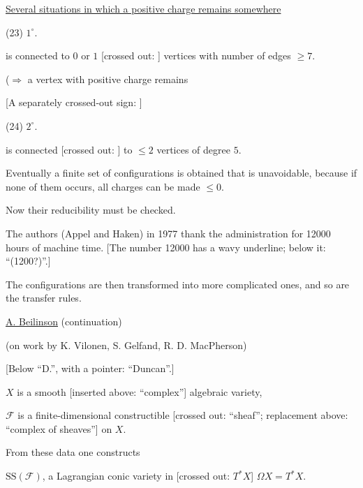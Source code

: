 \underline{Several situations in which a positive charge remains somewhere}

(23) $1^{\circ}$.
is connected to $0$ or $1$ [crossed out: ] vertices with number of edges $\geq7$.

($\Rightarrow$ a vertex with positive charge remains

[A separately crossed-out sign: ]

(24) $2^{\circ}$.
is connected [crossed out: ] to $\leq2$ vertices of degree $5$.

Eventually a finite set of configurations is obtained that is unavoidable,
because if none of them occurs, all
charges can be made $\leq0$.



Now their reducibility must be checked.

The authors (Appel and Haken) in 1977 thank the administration
for 12000 hours of machine time.
[The number 12000 has a wavy underline; below it: “(1200?)”.]

The configurations are then transformed into more complicated ones,
and so are the transfer rules.

\underline{\underline{A. Beilinson}} (continuation)

(on work by K. Vilonen, S. Gelfand, R. D. MacPherson)

[Below “D.”, with a pointer: “Duncan”.]

$X$ is a smooth [inserted above: “complex”] algebraic variety,

$\mathcal{F}$ is a finite-dimensional constructible [crossed out: “sheaf”; replacement above: “complex of sheaves”] on $X$.

From these data one constructs

$\mathrm{SS}(\mathcal{F})$, a Lagrangian conic variety in
[crossed out: $T^*X$] $\Omega X=T^*X$.

